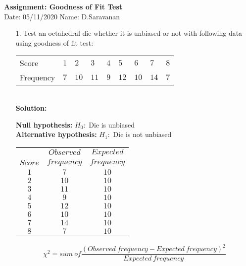 \documentclass[a4paper,11pt,openright]{report}
\begin{document}
\singlespacing
\pagestyle{plain}

\begin{center}
\textbf{Assignment: Goodness of Fit Test} \\
Date: 05/11/2020 \hspace{2mm} Name: D.Saravanan
\end{center}

\vspace{10px}

\begin{enumerate}

\item[1.] Test an octahedral die whether it is unbiased or not with following data using
goodness of fit test:

\begin{tabular}{lllllllll}
Score & $1$ & $2$ & $3$ & $4$ & $5$ & $6$ & $7$ & $8$ \\
Frequency & $7$ & $10$ & $11$ & $9$ & $12$ & $10$ & $14$ & $7$ \\
\end{tabular} \\

\textbf{Solution:}

\textbf{Null hypothesis:} $H_{0}:$ Die is unbiased \\
\textbf{Alternative hypothesis:} $H_{1}:$ Die is not unbiased \\

\begin{center}
\begin{tabular}{ccc}
& $Observed$ & $Expected$ \\
$Score$ & $frequency$ & $frequency$ \\
\hline
$1$ & $7$ & $10$ \\
$2$ & $10$ & $10$ \\
$3$ & $11$ & $10$ \\
$4$ & $9$ & $10$ \\
$5$ & $12$ & $10$ \\
$6$ & $10$ & $10$ \\
$7$ & $14$ & $10$ \\
$8$ & $7$ & $10$ \\
\end{tabular}
\end{center}


\begin{equation*}
\chi^2 = sum \: of \frac{(Observed \: frequency - Expected \: frequency)^2}{Expected \: frequency}
\end{equation*}


\end{enumerate}
\end{document}
